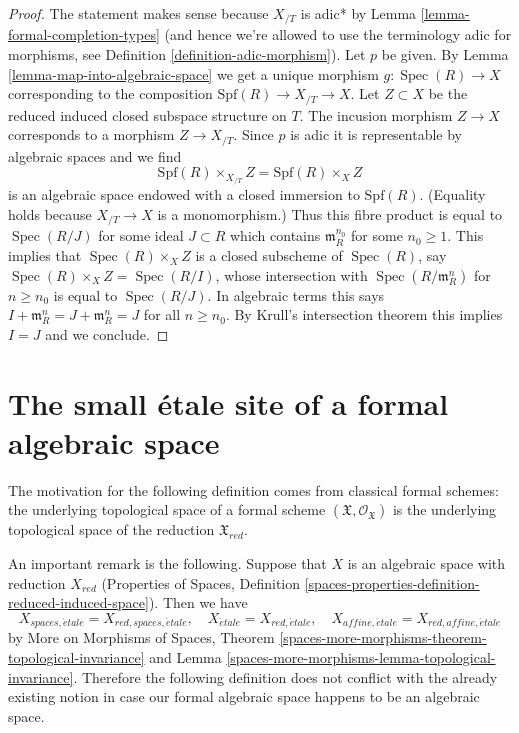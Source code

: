 \documentclass{stacks-project}
\theoremstyle{plain}
\theoremstyle{definition}
\theoremstyle{remark}
\numberwithin{equation}{subsection}
\def\Spec{\mathop{\mathrm{Spec}}}
\def\etale{{\acute{e}tale}}
\begin{document}
\begin{proof}
The statement makes sense because $X_{/T}$ is adic* by
Lemma \ref{lemma-formal-completion-types} (and hence we're
allowed to use the terminology adic for morphisms, see
Definition \ref{definition-adic-morphism}).
Let $p$ be given. By Lemma \ref{lemma-map-into-algebraic-space}
we get a unique morphism $g : \Spec(R) \to X$ corresponding to
the composition $\text{Spf}(R) \to X_{/T} \to X$.
Let $Z \subset X$ be the reduced induced closed subspace structure
on $T$. The incusion morphism $Z \to X$ corresponds to a morphism
$Z \to X_{/T}$. Since $p$ is adic it is representable by algebraic
spaces and we find
$$
\text{Spf}(R) \times_{X_{/T}} Z = \text{Spf}(R) \times_X Z
$$
is an algebraic space endowed with a closed immersion to $\text{Spf}(R)$.
(Equality holds because $X_{/T} \to X$ is a monomorphism.)
Thus this fibre product is equal to $\Spec(R/J)$ for some
ideal $J \subset R$ which contains $\mathfrak m_R^{n_0}$ for some
$n_0 \geq 1$. This implies that $\Spec(R) \times_X Z$
is a closed subscheme of $\Spec(R)$,
say $\Spec(R) \times_X Z = \Spec(R/I)$, whose intersection with
$\Spec(R/\mathfrak m_R^n)$ for $n \geq n_0$ is equal to $\Spec(R/J)$.
In algebraic terms this says
$I + \mathfrak m_R^n = J + \mathfrak m_R^n = J$ for all $n \geq n_0$.
By Krull's intersection theorem
this implies $I = J$ and we conclude.
\end{proof}








\section{The small \'etale site of a formal algebraic space}
\label{section-etale-sites}

\noindent
The motivation for the following definition comes from classical
formal schemes: the underlying topological space of a formal scheme
$(\mathfrak X, \mathcal{O}_\mathfrak X)$
is the underlying topological space of the reduction $\mathfrak X_{red}$.

\medskip\noindent
An important remark is the following. Suppose that $X$ is an algebraic space
with reduction $X_{red}$ (Properties of Spaces, Definition
\ref{spaces-properties-definition-reduced-induced-space}).
Then we have
$$
X_{spaces, \etale} = X_{red, spaces, \etale},\quad
X_\etale = X_{red, \etale},\quad
X_{affine, \etale} = X_{red, affine, \etale}
$$
by More on Morphisms of Spaces, Theorem
\ref{spaces-more-morphisms-theorem-topological-invariance} and
Lemma \ref{spaces-more-morphisms-lemma-topological-invariance}.
Therefore the following definition does not conflict with the already
existing notion in case our formal algebraic space happens to be
an algebraic space.
\end{document}
